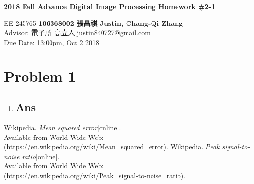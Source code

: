 \documentclass[a4paper, 11pt]{article}
\begin{document}
\noindent
\begin{center}
  \large\textbf{2018 Fall Advance Digital Image Processing Homework \#2-1} \\
\end{center}
\begin{CJK}{UTF8}{bsmi}
\normalsize EE 245765 \hfill \textbf{106368002 張昌祺 Justin, Chang-Qi Zhang} \\
Advisor: 電子所 高立人 \hfill justin840727@gmail.com \\
\null\hfill Due Date: 13:00pm, Oct 2 2018 \\
\end{CJK}

\section*{Problem 1}
\begin{enumerate}[label=\alph*.]
  \item 
    \blindtext[1]
    \subsection*{Ans}
    \blindtext[1]
\end{enumerate}

\begin{thebibliography}{9}
   Wikipedia. \emph{Mean squared error}[online]. \\
  Available from World Wide Web: (https://en.wikipedia.org/wiki/Mean\_squared\_error).
   Wikipedia. \emph{Peak signal-to-noise ratio}[online].\\
  Available from World Wide Web: \\
  (https://en.wikipedia.org/wiki/Peak\_signal-to-noise\_ratio).
\end{thebibliography}
\end{document}
